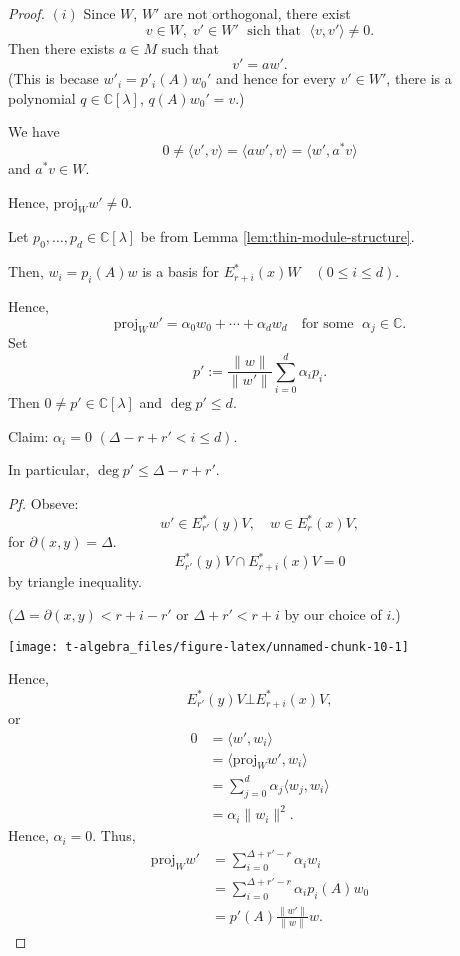 \documentclass[
]{book}
\theoremstyle{definition}
\theoremstyle{definition}
\theoremstyle{definition}
\theoremstyle{definition}
\theoremstyle{remark}
\begin{document}
\begin{proof}
\((i)\) Since \(W\), \(W'\) are not orthogonal, there exist
\[v\in W, \; v'\in W' \; \text{ sich that }\; \langle v, v'\rangle \neq 0.\]
Then there exists \(a\in M\) such that
\[v' = aw'.\]
(This is becase \(w'_i = p'_i(A)w_0'\) and hence for every \(v'\in W'\), there is a polynomial \(q\in \mathbb{C}[\lambda]\), \(q(A)w_0' = v\).)

We have
\[0\neq \langle v', v\rangle = \langle aw', v\rangle = \langle w', a^*v\rangle\]
and \(a^*v\in W\).

Hence, \(\mathrm{proj}_{W} w' \neq 0\).

Let \(p_0, \ldots, p_d\in \mathbb{C}[\lambda]\) be from Lemma \ref{lem:thin-module-structure}.

Then, \(w_i = p_i(A)w\) is a basis for \(E^*_{r+i}(x)W \quad (0\leq i\leq d)\).

Hence,
\[\mathrm{proj}_{W}w' = \alpha_0w_0 + \cdots + \alpha_dw_d \quad \text{for some }\; \alpha_j\in \mathbb{C}.\]
Set
\[p' := \frac{\|w\|}{\|w'\|}\sum_{i=0}^d \alpha_ip_i.\]
Then \(0\neq p'\in \mathbb{C}[\lambda]\) and \(\deg p' \leq d\).

Claim: \(\alpha_i = 0\) \((\Delta - r + r' < i\leq d)\).

In particular, \(\deg p' \leq \Delta - r + r'\).

\emph{Pf.} Obseve:
\[w'\in E^*_{r'}(y)V, \quad w \in E^*_r(x)V,\]
for \(\partial(x,y) = \Delta\).
\[E^*_{r'}(y)V \cap E^*_{r+i}(x)V = 0\]
by triangle inequality.

(\(\Delta = \partial(x,y) < r+i - r'\) or \(\Delta + r' < r + i\) by our choice of \(i\).)

\begin{center}\texttt{[image: t-algebra\_files/figure-latex/unnamed-chunk-10-1]} \end{center}

Hence,
\[E^*_{r'}(y)V \bot E^*_{r+i}(x)V,\]
or
\begin{align}
0 & = \langle w', w_i\rangle \\
& = \langle \mathrm{proj}_{W}w', w_i\rangle\\
& = \sum_{j=0}^d\alpha_j\langle w_j, w_i\rangle\\
& = \alpha_i\|w_i\|^2.
\end{align}
Hence, \(\alpha_i = 0\).
Thus,
\begin{align}
\mathrm{proj}_{W}w' & = \sum_{i=0}^{\Delta + r' - r}\alpha_iw_i\\
& = \sum_{i=0}^{\Delta + r' - r}\alpha_ip_i(A)w_0\\
& = p'(A)\frac{\|w'\|}{\|w\|}w.
\end{align}


\end{proof}
\end{document}

